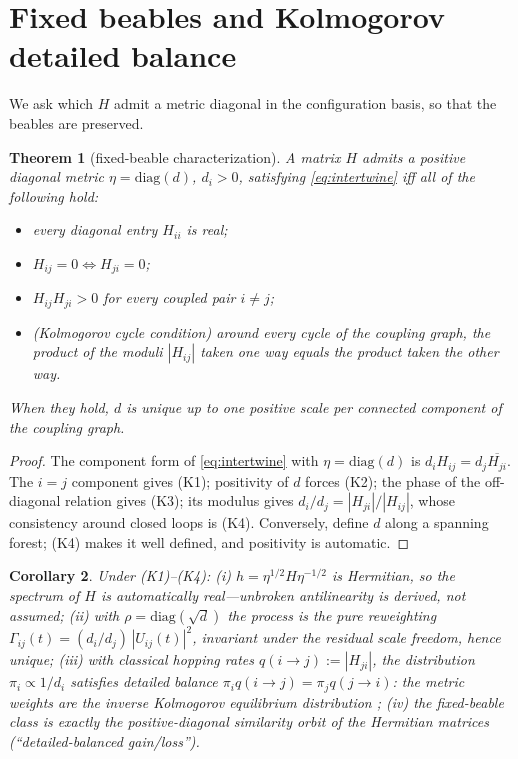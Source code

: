 \documentclass[11pt]{article}
\newtheorem{theorem}{Theorem}[section]
\newtheorem{corollary}[theorem]{Corollary}
\theoremstyle{definition}
\theoremstyle{remark}
\newcommand{\Gam}{\Gamma}
\begin{document}
\section{Fixed beables and Kolmogorov detailed balance}
\label{sec:kolmogorov}

We ask which $H$ admit a metric diagonal in the configuration basis, so
that the beables are preserved.

\begin{theorem}[fixed-beable characterization]
\label{thm:kolmogorov}
A matrix $H$ admits a positive diagonal metric $\eta=\mathrm{diag}(d)$,
$d_i>0$, satisfying \eqref{eq:intertwine} iff all of the following hold:
\begin{itemize}
\item[\emph{(K1)}] every diagonal entry $H_{ii}$ is real;
\item[\emph{(K2)}] $H_{ij}=0 \Leftrightarrow H_{ji}=0$;
\item[\emph{(K3)}] $H_{ij}H_{ji}>0$ for every coupled pair $i\ne j$;
\item[\emph{(K4)}] \emph{(Kolmogorov cycle condition)} around every cycle
of the coupling graph, the product of the moduli $|H_{ij}|$ taken one way
equals the product taken the other way.
\end{itemize}
When they hold, $d$ is unique up to one positive scale per connected
component of the coupling graph.
\end{theorem}

\begin{proof}
The component form of \eqref{eq:intertwine} with $\eta=\mathrm{diag}(d)$ is
$d_iH_{ij}=d_j\overline{H_{ji}}$. The $i=j$ component gives (K1);
positivity of $d$ forces (K2); the phase of the off-diagonal relation gives
(K3); its modulus gives $d_i/d_j=|H_{ji}|/|H_{ij}|$, whose consistency
around closed loops is (K4). Conversely, define $d$ along a spanning
forest; (K4) makes it well defined, and positivity is automatic.
\end{proof}

\begin{corollary}
\label{cor:kolmogorov}
Under \emph{(K1)--(K4)}:
(i) $h=\eta^{1/2}H\eta^{-1/2}$ is Hermitian, so the spectrum of $H$ is
automatically real---unbroken antilinearity is derived, not assumed;
(ii) with $\rho=\mathrm{diag}(\sqrt d)$ the process is the pure
reweighting
$\Gam_{ij}(t)=(d_i/d_j)\,|U_{ij}(t)|^{2}$,
invariant under the residual scale freedom, hence \emph{unique};
(iii) with classical hopping rates $q(i{\to}j):=|H_{ji}|$, the distribution
$\pi_i\propto 1/d_i$ satisfies detailed balance
$\pi_i q(i{\to}j)=\pi_j q(j{\to}i)$: the metric weights are the inverse
Kolmogorov equilibrium distribution \cite{Kolmogorov1936,Kelly1979};
(iv) the fixed-beable class is exactly the positive-diagonal similarity
orbit of the Hermitian matrices (``detailed-balanced gain/loss'').
\end{corollary}
\end{document}
